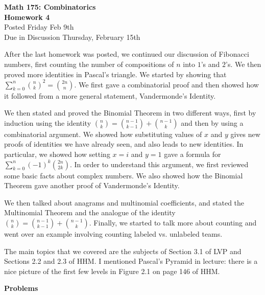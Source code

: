 \documentclass[11pt]{article}
\begin{document}
\begin{center}
{\Large \bf Math 175: Combinatorics} \\
{\Large \bf Homework 4}\\
{\Large Posted Friday Feb 9th}\\
{\Large Due in Discussion Thursday, February 15th}
\end{center}


After the last homework was posted, we continued our discussion of Fibonacci numbers, first counting the number of compositions of $n$ into $1$'s and $2$'s.  We then proved more identities in Pascal's triangle.  We started by showing that $\sum_{k=0}^n \binom{n}{k}^2 = \binom{2n}{n}$.  We first gave a combinatorial proof and then showed how it followed from a more general statement, Vandermonde's Identity.  

We then stated and proved the Binomial Theorem in two different ways, first by induction using the identity $\binom{n}{k} = \binom{n-1}{k-1} + \binom{n-1}{k}$ and then by using a combinatorial argument.  We showed how substituting values of $x$ and $y$ gives new proofs of identities we have already seen, and also leads to new identities.  In particular, we showed how setting $x = i$ and $y = 1$ gave a formula for $\sum_{k=0}^n (-1)^k \binom{2n}{2k}$.  In order to understand this argument, we first reviewed some basic facts about complex numbers.  We also showed how the Binomial Theorem gave another proof of Vandermonde's Identity.

We then talked about anagrams and multinomial coefficients, and stated the Multinomial Theorem and the analogue of the identity $\binom{n}{k} = \binom{n-1}{k-1} + \binom{n-1}{k}$.  Finally, we started to talk more about counting and went over an example involving counting labeled vs. unlabeled teams.

The main topics that we covered are the subjects of Section 3.1 of LVP and Sections 2.2 and 2.3 of HHM.  I mentioned Pascal's Pyramid in lecture: there is a nice picture of the first few levels in Figure 2.1 on page 146 of HHM.

\newpage

\centerline{ \bf \Large Problems}
\end{document}
